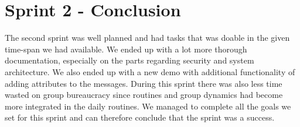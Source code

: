 \section{Sprint 2 - Conclusion}
The second sprint was well planned and had tasks that was doable in the given time-span we had available. We ended up with a lot more thorough documentation, especially on the parts regarding security and system architecture. We also ended up with a new demo with additional functionality of adding attributes to the messages. During this sprint there was also less time wasted on group bureaucracy since routines and group dynamics had become more integrated in the daily routines. We managed to complete all the goals we set for this sprint and can therefore conclude that the sprint was a success.     